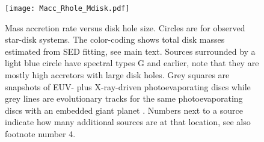 \documentclass{rsos}
\begin{document}

\begin{figure}[b]
\centering
\texttt{[image: Macc\_Rhole\_Mdisk.pdf]}
\caption{Mass accretion rate versus disk hole size. Circles are for observed star-disk systems. The color-coding shows total disk masses estimated from SED fitting, see main text. Sources surrounded by a light blue circle have spectral types G and earlier, note that they are mostly high accretors with large disk holes. Grey squares are snapshots of EUV- plus X-ray-driven photoevaporating discs \cite{2011MNRAS.412...13O} while grey lines are evolutionary tracks for the same photoevaporating discs with an embedded giant planet \cite{2013MNRAS.430.1392R}. Numbers next to a source indicate how many additional sources are at that location, see also footnote number 4.}\label{fig:MaccRhole}
\end{figure}
\end{document}
